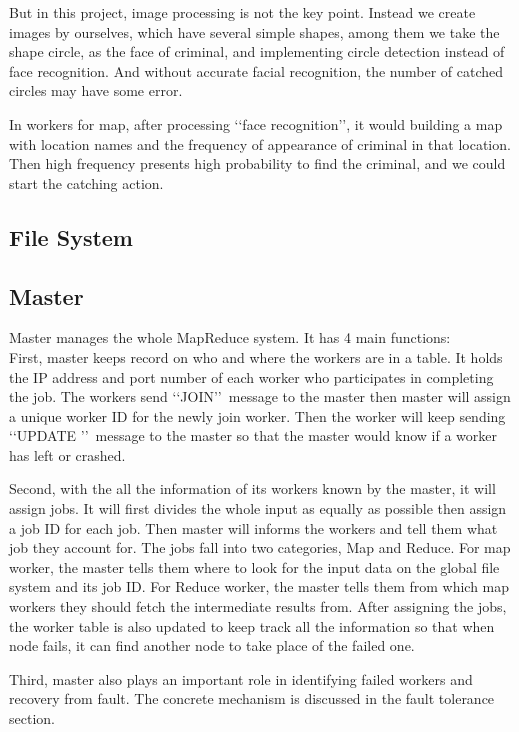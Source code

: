\documentclass[12pt]{article}
\begin{document}
But in this project, image processing is not the key point. Instead we create images by ourselves, which have several simple shapes, among them we take the shape circle, as the face of criminal, and implementing circle detection instead of face recognition. And without accurate facial recognition, the number of catched circles may have some error.

In workers for map, after processing \lq\lq face recognition\rq\rq, it would building a map with location names and the frequency of appearance of criminal in that location. Then high frequency presents high probability to find the criminal, and we could start the catching action. 
\subsection{File System}
\subsection{Master}

Master manages the whole MapReduce system. It has 4 main functions: \\
First, master keeps record on who and where the workers are in a table. It holds the IP address and 
port number of each worker who participates in completing the job. The workers send \lq\lq JOIN\rq\rq\  
message to the master then master will assign a unique worker ID for the newly join worker.
Then the worker will keep sending \lq\lq UPDATE \rq\rq\ message to the master so that the master would know
if a worker has left or crashed.
  
Second, with the all the information of its workers known by the master, it will assign jobs. It will
first divides the whole input as equally as possible then assign a job ID for each job. Then master will informs the workers and tell them 
what job they account for. The jobs fall into two categories, Map and Reduce. For map worker, the master tells
them where to look for the input data on the global file system and its job ID. For Reduce worker, the master tells
them from which map workers they should fetch the intermediate results from. After assigning the jobs, the worker table
is also updated to keep track all the information so that when node fails, it can find another node to take place of the 
failed one.

Third, master also plays an important role in identifying failed workers and recovery from fault. The concrete mechanism
is discussed in the fault tolerance section.
\end{document}
